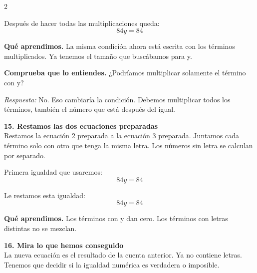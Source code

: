 \documentclass[11pt,a4paper,landscape]{article}
\begin{document}
\begin{multicols*}{2}
\begin{minipage}{\linewidth}
\par\smallskip Después de hacer todas las multiplicaciones queda:
\[84y = 84\]
\par\smallskip\textbf{Qué aprendimos.} La misma condición ahora está escrita con los términos multiplicados. Ya tenemos el tamaño que buscábamos para y.
\par\smallskip\textbf{Comprueba que lo entiendes.} ¿Podríamos multiplicar solamente el término con y?\par\textit{Respuesta:} No. Eso cambiaría la condición. Debemos multiplicar todos los términos, también el número que está después del igual.
\end{minipage}\par\medskip
\noindent\begin{minipage}{\linewidth}\textbf{15. Restamos las dos ecuaciones preparadas}\\[2pt]Restamos la ecuación 2 preparada a la ecuación 3 preparada. Juntamos cada término solo con otro que tenga la misma letra. Los números sin letra se calculan por separado.
\par{}\par\smallskip
\par\smallskip Primera igualdad que usaremos:
\[84y = 84\]
\par\smallskip Le restamos esta igualdad:
\[84y = 84\]
\par\smallskip\textbf{Qué aprendimos.} Los términos con y dan cero. Los términos con letras distintas no se mezclan.
\end{minipage}\par\medskip
\noindent\begin{minipage}{\linewidth}\textbf{16. Mira lo que hemos conseguido}\\[2pt]La nueva ecuación es el resultado de la cuenta anterior. Ya no contiene letras. Tenemos que decidir si la igualdad numérica es verdadera o imposible.

\end{minipage}
\end{multicols*}
\end{document}

